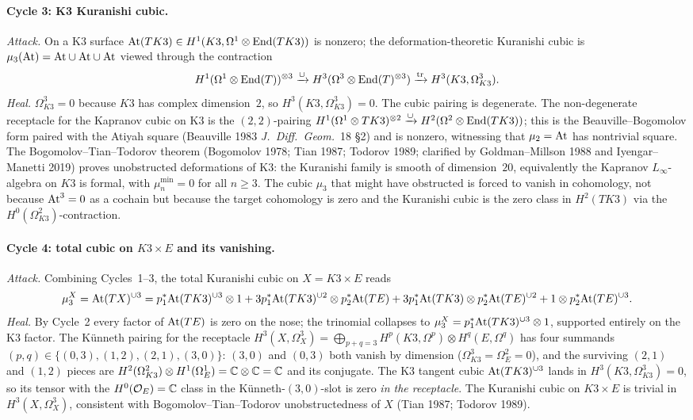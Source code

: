 \paragraph{Cycle 3: K3 Kuranishi cubic.}
\emph{Attack.}
On a K3 surface $\mathrm{At}(TK3) \in H^1(K3, \Omega^1 \otimes \mathrm{End}(TK3))$ is
nonzero; the deformation-theoretic Kuranishi cubic is
$\mu_3(\mathrm{At}) = \mathrm{At} \cup \mathrm{At} \cup \mathrm{At}$ viewed through the contraction
\[
  H^1(\Omega^1 \otimes \mathrm{End}(T))^{\otimes 3}
  \xrightarrow{\cup}
  H^3(\Omega^3 \otimes \mathrm{End}(T)^{\otimes 3})
  \xrightarrow{\mathrm{tr}}
  H^3(K3, \Omega^3_{K3}).
\]
\emph{Heal.}
$\Omega^3_{K3} = 0$ because $K3$ has complex dimension~$2$, so
$H^3(K3, \Omega^3_{K3}) = 0$. The cubic pairing is degenerate. The
non-degenerate receptacle for the Kapranov cubic on K3 is the
$(2,2)$-pairing
$H^1(\Omega^1 \otimes TK3)^{\otimes 2} \xrightarrow{\cup}
H^2(\Omega^2 \otimes \mathrm{End}(TK3))$; this is the Beauville--Bogomolov
form paired with the Atiyah square (Beauville 1983
\emph{J.\ Diff.\ Geom.}~18 \S 2) and is nonzero, witnessing that
$\mu_2 = \mathrm{At}$ has nontrivial square. The Bogomolov--Tian--Todorov
theorem (Bogomolov 1978; Tian 1987; Todorov 1989; clarified by
Goldman--Millson 1988 and Iyengar--Manetti 2019) proves unobstructed
deformations of K3: the Kuranishi family is smooth of dimension~$20$,
equivalently the Kapranov $L_\infty$-algebra on $K3$ is formal, with
$\mu_n^{\min} = 0$ for all $n \geq 3$. The cubic $\mu_3$ that might
have obstructed is forced to vanish in cohomology, not because
$\mathrm{At}^3 = 0$ as a cochain but because the target cohomology is zero
and the Kuranishi cubic is the zero class in $H^2(TK3)$
via the $H^0(\Omega^2_{K3})$-contraction.

\paragraph{Cycle 4: total cubic on $K3 \times E$ and its vanishing.}
\emph{Attack.}
Combining Cycles~1--3, the total Kuranishi cubic on $X = K3 \times E$
reads
\[
  \mu_3^X = \mathrm{At}(TX)^{\cup 3} = p_1^*\mathrm{At}(TK3)^{\cup 3} \otimes 1
  + 3 p_1^*\mathrm{At}(TK3)^{\cup 2} \otimes p_2^*\mathrm{At}(TE)
  + 3 p_1^*\mathrm{At}(TK3) \otimes p_2^*\mathrm{At}(TE)^{\cup 2}
  + 1 \otimes p_2^*\mathrm{At}(TE)^{\cup 3}.
\]
\emph{Heal.}
By Cycle~2 every factor of $\mathrm{At}(TE)$ is zero on the nose; the
trinomial collapses to
$\mu_3^X = p_1^*\mathrm{At}(TK3)^{\cup 3} \otimes 1$, supported entirely on
the K3 factor. The K\"unneth pairing for the receptacle
$H^3(X, \Omega^3_X) = \bigoplus_{p+q=3} H^p(K3, \Omega^p) \otimes
H^q(E, \Omega^q)$ has four summands $(p,q) \in \{(0,3), (1,2), (2,1),
(3,0)\}$: $(3,0)$ and $(0,3)$ both vanish by dimension
($\Omega^3_{K3} = \Omega^2_E = 0$), and the surviving $(2,1)$ and
$(1,2)$ pieces are $H^2(\Omega^2_{K3}) \otimes H^1(\Omega^1_E)
= \mathbb{C} \otimes \mathbb{C} = \mathbb{C}$ and its conjugate. The K3 tangent cubic
$\mathrm{At}(TK3)^{\cup 3}$ lands in $H^3(K3, \Omega^3_{K3}) = 0$, so its
tensor with the $H^0(\mathcal{O}_E) = \mathbb{C}$ class in the K\"unneth-$(3,0)$-slot
is zero \emph{in the receptacle}. The Kuranishi cubic on
$K3 \times E$ is trivial in $H^3(X, \Omega^3_X)$, consistent with
Bogomolov--Tian--Todorov unobstructedness of $X$ (Tian 1987; Todorov
1989).

